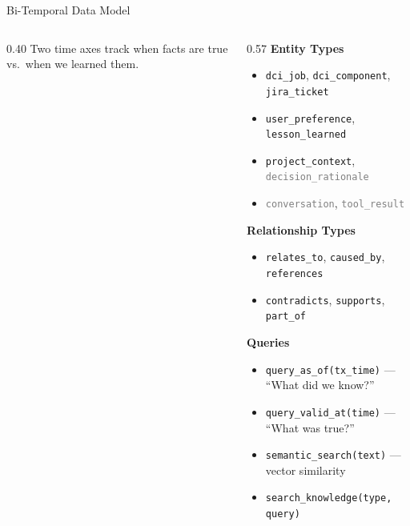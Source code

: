 \documentclass[aspectratio=169,10pt]{beamer}
\begin{document}
\begin{frame}[fragile]{Bi-Temporal Data Model}
\begin{columns}[T]
\begin{column}{0.40\textwidth}
\smallskip
{\scriptsize\color{gray} Two time axes track \textcolor{rhred}{when facts are true} vs.\ \textcolor{rhblue}{when we learned them}.}
\end{column}
\begin{column}{0.57\textwidth}
\textbf{Entity Types}
\begin{itemize}\scriptsize
  \item \textcolor{rhred}{\texttt{dci\_job}}, \textcolor{rhred}{\texttt{dci\_component}}, \textcolor{rhorange}{\texttt{jira\_ticket}}
  \item \textcolor{rhgreen}{\texttt{user\_preference}}, \textcolor{rhpurple}{\texttt{lesson\_learned}}
  \item \textcolor{rhteal}{\texttt{project\_context}}, \textcolor{gray}{\texttt{decision\_rationale}}
  \item \textcolor{gray}{\texttt{conversation}}, \textcolor{gray}{\texttt{tool\_result}}
\end{itemize}
\smallskip
\textbf{Relationship Types}
\begin{itemize}\scriptsize
  \item \texttt{relates\_to}, \texttt{caused\_by}, \texttt{references}
  \item \texttt{contradicts}, \texttt{supports}, \texttt{part\_of}
\end{itemize}
\smallskip
\textbf{Queries}
\begin{itemize}\scriptsize
  \item \texttt{query\_as\_of(tx\_time)} --- ``What did we know?''
  \item \texttt{query\_valid\_at(time)} --- ``What was true?''
  \item \texttt{semantic\_search(text)} --- vector similarity
  \item \texttt{search\_knowledge(type, query)}
\end{itemize}
\end{column}
\end{columns}
\end{frame}
\end{document}
